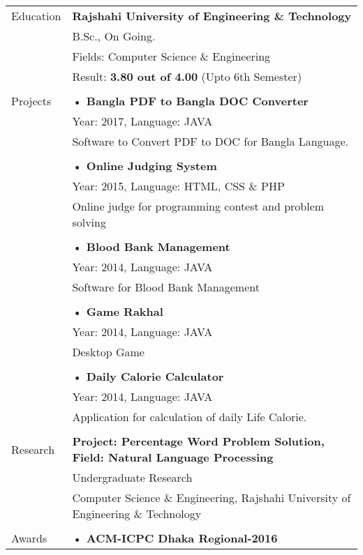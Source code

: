\documentclass[letterpaper,11pt,oneside]{article}
\begin{document}
\noindent \begin{tabular}{@{} l l}

 \Large{Education}    & \textbf{Rajshahi University of Engineering \& Technology} \\
     & B.Sc., On Going. \\
     & Fields: Computer Science \& Engineering \\
     & Result: \textbf{3.80 out of 4.00} (Upto 6th Semester)\\
     \\
 \Large{Projects}    & \textbf{• Bangla PDF to Bangla DOC Converter} \\
 	& Year: 2017, Language: JAVA\\
    & \parbox{5.0in}{Software to Convert PDF to DOC for Bangla Language.}\\
    & \\
    & \textbf{• Online Judging System}\\
    & Year: 2015, Language: HTML, CSS \& PHP \\
    & \parbox{5.0in}{Online judge for programming contest and problem solving}\\
    & \\
    & \textbf{• Blood Bank Management}\\
    & Year: 2014, Language: JAVA \\
    & \parbox{5.0in}{Software for Blood Bank Management}\\
    & \\
    & \textbf{• Game Rakhal}\\
    & Year: 2014, Language: JAVA \\
    & \parbox{5.0in}{Desktop Game}\\
    & \\
    & \textbf{• Daily Calorie Calculator}\\
    & Year: 2014, Language: JAVA \\
    & \parbox{5.0in}{Application for calculation of daily Life Calorie.}\\
    \\
 \Large{Research}    & \textbf{Project: Percentage Word Problem Solution, Field: Natural Language Processing} \\
     & Undergraduate Research \\
     & Computer Science \& Engineering, Rajshahi University of Engineering \& Technology\\
     \\
  \Large{Awards}      & \textbf{• ACM-ICPC Dhaka Regional-2016} \\

\end{tabular}
\end{document}
